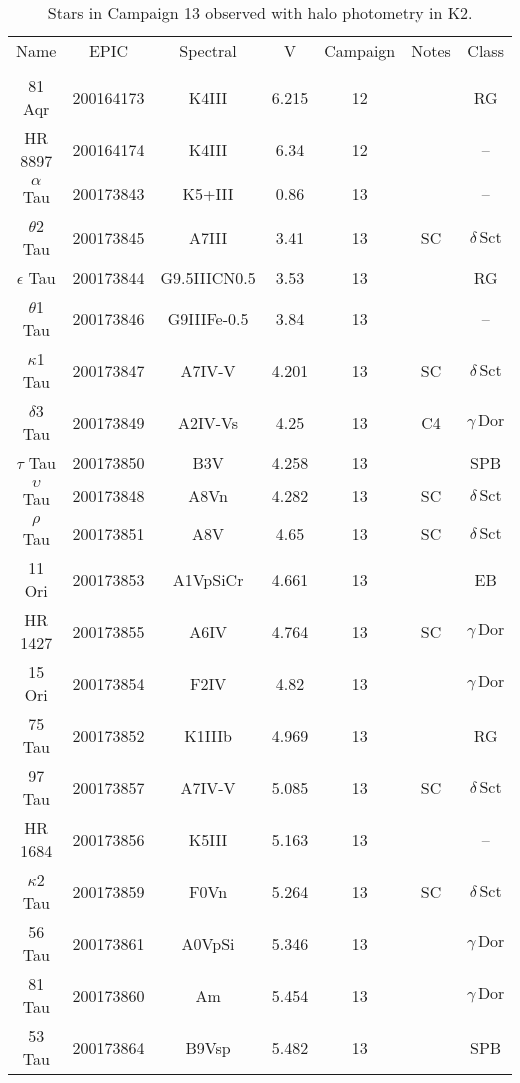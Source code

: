 \begin{table*}
\caption{Stars in Campaign 13 observed with halo photometry in K2.\label{table_3}}
\begin{tabular}{ccccccc}
\hline \hline
Name & EPIC & Spectral & V & Campaign & Notes & Class \\
 &  &  &  &  &  &  \\
\hline
81 Aqr & 200164173 & K4III & 6.215 & 12 &  & RG \\
HR 8897 & 200164174 & K4III & 6.34 & 12 &  & -- \\
$\alpha$ Tau & 200173843 & K5+III & 0.86 & 13 & \tablenotemark{c} & -- \\
$\theta$2 Tau & 200173845 & A7III & 3.41 & 13 & SC & $\delta\,\text{Sct}$ \\
$\epsilon$ Tau & 200173844 & G9.5IIICN0.5 & 3.53 & 13 & \tablenotemark{d} & RG \\
$\theta$1 Tau & 200173846 & G9IIIFe-0.5 & 3.84 & 13 &  & -- \\
$\kappa$1 Tau & 200173847 & A7IV-V & 4.201 & 13 & SC & $\delta\,\text{Sct}$ \\
$\delta$3 Tau & 200173849 & A2IV-Vs & 4.25 & 13 & C4 & $\gamma\,\text{Dor}$ \\
$\tau$ Tau & 200173850 & B3V & 4.258 & 13 &  & SPB \\
$\upsilon$ Tau & 200173848 & A8Vn & 4.282 & 13 & SC & $\delta\,\text{Sct}$ \\
$\rho$ Tau & 200173851 & A8V & 4.65 & 13 & SC & $\delta\,\text{Sct}$ \\
11 Ori & 200173853 & A1VpSiCr & 4.661 & 13 &  & EB \\
HR 1427 & 200173855 & A6IV & 4.764 & 13 & SC & $\gamma\,\text{Dor}$ \\
15 Ori & 200173854 & F2IV & 4.82 & 13 &  & $\gamma\,\text{Dor}$ \\
75 Tau & 200173852 & K1IIIb & 4.969 & 13 &  & RG \\
97 Tau & 200173857 & A7IV-V & 5.085 & 13 & SC & $\delta\,\text{Sct}$ \\
HR 1684 & 200173856 & K5III & 5.163 & 13 &  & -- \\
$\kappa$2 Tau & 200173859 & F0Vn & 5.264 & 13 & SC & $\delta\,\text{Sct}$ \\
56 Tau & 200173861 & A0VpSi & 5.346 & 13 &  & $\gamma\,\text{Dor}$ \\
81 Tau & 200173860 & Am & 5.454 & 13 &  & $\gamma\,\text{Dor}$ \\
53 Tau & 200173864 & B9Vsp & 5.482 & 13 &  & SPB \\

\end{tabular}
\end{table*}

